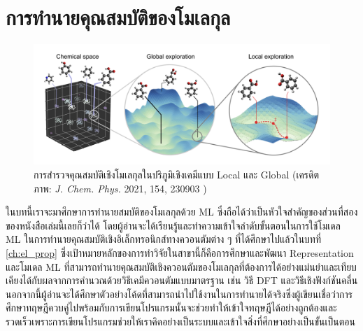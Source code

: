 

\chapter{การทำนายคุณสมบัติของโมเลกุล}
\label{ch:predict_molprop}

\begin{figure}[H]
    \centering
    \includegraphics[width=\linewidth]{fig/ml_pred_chem.png}
    \caption{การสำรวจคุณสมบัติเชิงโมเลกุลในปริภูมิเชิงเคมีแบบ Local และ Global
        (เครดิตภาพ: \textit{J. Chem. Phys.} 2021, 154, 230903 \autocite{westermayr2021b})}
    \label{fig:ml_pred_chem}
\end{figure}

ในบทนี้เราจะมาศึกษาการทำนายสมบัติของโมเลกุลด้วย ML ซึ่งถือได้ว่าเป็นหัวใจสำคัญของส่วนที่สองของหนังสือเล่มนี้เลยก็ว่าได้ โดยผู้อ่านจะได้เรียนรู้และทำความเข้าใจลำดับขั้นตอนในการใช้โมเดล ML ในการทำนายคุณสมบัติเชิงอิเล็กทรอนิกส์ทางควอนตัมต่าง ๆ ที่ได้ศึกษาไปแล้วในบทที่ \ref{ch:el_prop} ซึ่งเป้าหมายหลักของการทำวิจัยในสาขานี้ก็คือการศึกษาและพัฒนา Representation และโมเดล ML ที่สามารถทำนายคุณสมบัติเชิงควอนตัมของโมเลกุลที่ต้องการได้อย่างแม่นยำและเทียบเคียงได้กับผลจากการคำนวณด้วยวิธีเคมีควอนตัมแบบมาตรฐาน เช่น วิธี DFT และวิธีเชิงฟังก์ชันคลื่น\autocite{ceriotti2018} นอกจากนี้ผู้อ่านจะได้ศึกษาตัวอย่างโค้ดที่สามารถนำไปใช้งานในการทำนายได้จริงซึ่งผู้เขียนเชื่อว่าการศึกษาทฤษฎีควบคู่ไปพร้อมกับการเขียนโปรแกรมนั้นจะช่วยทำให้เข้าใจทฤษฎีได้อย่างถูกต้องและรวดเร็วเพราะการเขียนโปรแกรมช่วยให้เราคิดอย่างเป็นระบบและเข้าใจสิ่งที่ศึกษาอย่างเป็นขั้นเป็นตอน

